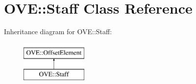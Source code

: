 \hypertarget{class_o_v_e_1_1_staff}{}\section{O\+VE\+:\+:Staff Class Reference}
\label{class_o_v_e_1_1_staff}
Inheritance diagram for O\+VE\+:\+:Staff\+:\begin{figure}[H]
\begin{center}
\leavevmode
\includegraphics[height=2.000000cm]{class_o_v_e_1_1_staff}
\end{center}
\end{figure}
